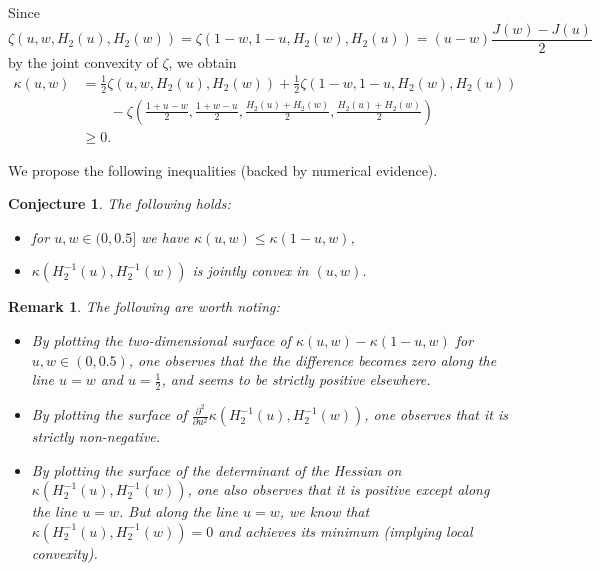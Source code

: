 \documentclass[conference,letterpaper,onecolumn]{IEEEtran}
\theoremstyle{plain}%
\newtheorem{rem}{Remark}
\newtheorem{conj}{Conjecture}
\begin{document}
Since $$\zeta(u,w,H_2(u),H_2(w))=\zeta(1-w,1-u,H_2(w),H_2(u))=(u-w)\frac{J(w) - J(u)}{2}$$
 by the joint convexity of $\zeta$, we obtain
\begin{align}
\kappa(u,w)&=\frac12\zeta(u,w,H_2(u),H_2(w))+\frac12\zeta(1-w,1-u,H_2(w),H_2(u))\nonumber\\&\qquad-\zeta\left(\frac{1+u-w}{2},\frac{1+w-u}{2},\frac{H_2(u)+H_2(w)}{2},\frac{H_2(u)+H_2(w)}{2}\right)\nonumber
\\&\geq 0. \label{eq:kapnonneg}
\end{align}

We propose the following inequalities (backed by numerical evidence).
\begin{conj}\label{conj2} The following holds:
    \begin{itemize}
        \item for $u,w\in(0,0.5]$ we have $\kappa(u,w)\leq \kappa(1-u,w)$,
        \item $\kappa(H_2^{-1}(u),H_2^{-1}(w))$ is jointly convex in $(u,w)$.
    \end{itemize}
\end{conj}

\begin{rem}
The following are worth noting:
\begin{itemize}
  \item By plotting the two-dimensional surface of \( \kappa(u,w) - \kappa(1-u,w) \) for \( u, w \in (0, 0.5) \), one observes that the the difference becomes zero along the line $u=w$ and $u=\frac 12$, and seems to be strictly positive elsewhere.
  \item By plotting the surface of $\frac{\partial^2}{\partial u^2} \kappa(H_2^{-1}(u),H_2^{-1}(w))$, one observes that it is strictly non-negative.
  \item By plotting the surface of the determinant of the Hessian on $\kappa(H_2^{-1}(u),H_2^{-1}(w))$, one also observes that it is positive except along the line $u=w$. But along the line $u=w$, we know that $\kappa(H_2^{-1}(u),H_2^{-1}(w))=0$ and achieves its minimum (implying local convexity).
  \end{itemize}
\end{rem}
\iffalse
While we lack a formal proof, we are confident in the validity of the conjecture presented above: the first part of the conjecture can be numerically validated by plotting the two-dimensional surface of \( r(u,w) - r(1-u,w) \) for \( u, w \in (0, 0.5] \). Likewise, the second part can be confirmed through numerical simulation by plotting the surface associated with the diagonal entries and the determinant of the Hessian matrix.\fi
\end{document}
